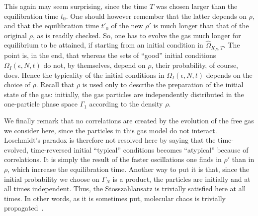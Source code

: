 \documentclass{article}
\numberwithin{equation}{section}
\begin{document}
This again may seem surprising, since the time $T$ was chosen larger than the equilibration time $t_0$. One should however remember that the latter depends on $\rho$, and that the equilibration time $t'_0$  of the new $\rho'$ is much longer than that of the original $\rho$, as is readily checked. So, one has to evolve the gas much longer for equilibrium to be attained, if starting from an initial condition in $\widehat\Omega_{K_N, T}$. The point is, in the end, that whereas the sets of ``good'' initial conditions $\Omega_I(\epsilon, N, t)$ do not, by themselves, depend on $\rho$, their probability, of course, does. Hence the typicality of the initial conditions in $\Omega_I( \epsilon, N, t)$ depends on the choice of $\rho$. Recall that $\rho$ is used only to describe the preparation of the initial state of the gas: initially, the gas particles are independently distributed in the one-particle phase space $\Gamma_1$ according to the density $\rho$.

We finally remark that no correlations are created by the evolution of the free gas we consider here, since the particles in this gas model do not interact. Loschmidt's paradox is therefore not resolved here by saying that the time-evolved, time-reversed initial ``typical'' conditions becomes ``atypical'' because of correlations. It is simply the result of the faster oscillations one finds in $\rho'$ than in $\rho$, which increase the equilibration time.
Another way to put it is that, since the initial probability we choose on $\Gamma_N$ is a product, the particles are initially and at all times independent. Thus, the Stosszahlansatz is trivially satisfied here at all times. In other words, as it is sometimes put, molecular chaos is trivially propagated~\cite{Vi12}.

\end{document}
